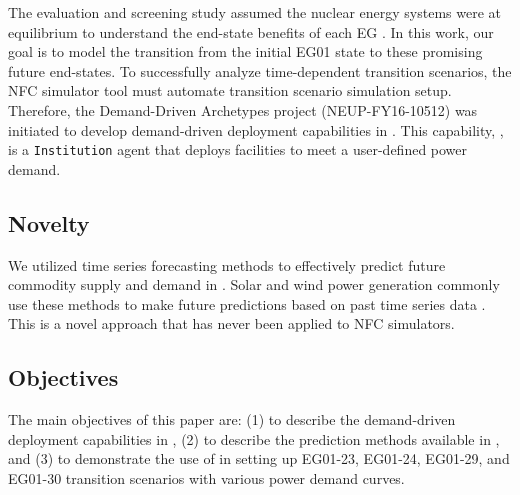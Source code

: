 The evaluation and screening study assumed
the nuclear energy systems were at equilibrium to understand 
the end-state benefits of each \gls{EG} \cite{feng_standardized_2016}. 
In this work, our goal is to model the transition from the initial EG01
state to these promising future end-states. 
To successfully analyze time-dependent transition
scenarios, the \gls{NFC} simulator tool must 
automate transition scenario simulation setup. 
Therefore, the Demand-Driven \Cycamore Archetypes project
(NEUP-FY16-10512) was initiated to develop 
demand-driven deployment capabilities in \Cyclus. 
This capability, \deploy, is a \Cyclus \texttt{Institution}
agent that deploys facilities to meet a user-defined power demand. 

\subsection{Novelty}
We utilized time series forecasting methods to effectively predict 
future commodity supply and demand in \deploy. 
Solar and wind power generation commonly use these methods
to make future predictions based on past time series data
\cite{reikard_predicting_2009,diagne_review_2013,soman_review_2010,taylor_wind_2009}. 
This is a novel approach that has never been applied to 
\gls{NFC} simulators. 

\subsection{Objectives}
\label{sec:obj}
The main objectives of this paper are: 
(1) to describe the demand-driven deployment capabilities in 
\Cyclus, 
(2) to describe the prediction methods available in 
\deploy, and
(3) to demonstrate the use of \deploy in setting up 
EG01-23, EG01-24, EG01-29, and EG01-30 transition scenarios 
with various power demand curves.